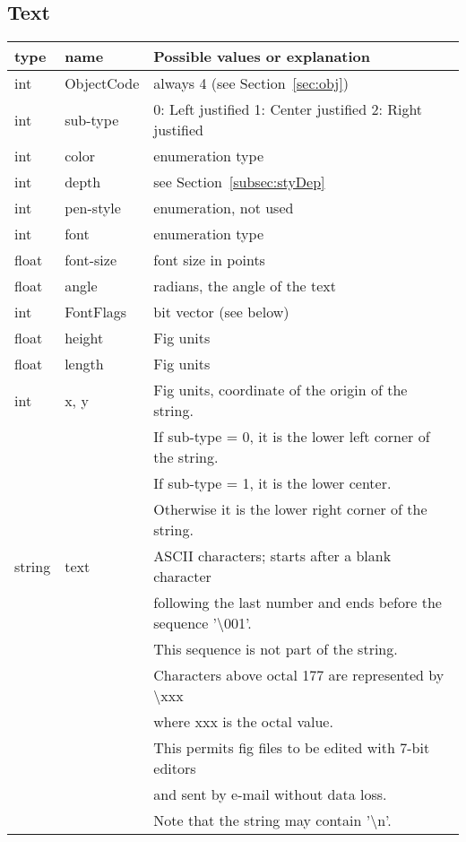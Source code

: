 \documentclass[10pt, a4paper]{article}
\begin{document}
\subsection{Text}\label{subsec:text}

\begin{tabular}{|lll|}
\hline
type & name & Possible values or explanation \\
\hline
\hline
int     & ObjectCode     & always 4 (see Section~\ref{sec:obj}) \\
int     & sub-type   & 0: Left justified
                       1: Center justified
                       2: Right justified \\
int     & color      & enumeration type \\
int     & depth      & see Section~\ref{subsec:styDep} \\
int     & pen-style  & enumeration, not used \\
int     & font       & enumeration type \\
float   & font-size  & font size in points \\
float   & angle      & radians, the angle of the text \\
int     & FontFlags & bit vector (see below) \\
float   & height     & Fig units \\
float   & length     & Fig units \\
int     & x, y       & Fig units, coordinate of the origin of the string.  \\
&&                     If sub-type = 0, 
                       it is the lower left corner of the string.\\
&&                     If sub-type = 1, 
                       it is the lower center.  \\
&&                     Otherwise it is the lower right corner of the string. \\
string    & text     & ASCII characters; 
                       starts after a blank character \\
&&                     following the last number and
                       ends before the sequence '\textbackslash 001'.  \\
&&                     This sequence is not part of the string.\\
&&                     Characters above octal 177 are
                       represented by \textbackslash xxx\\
&&                     where xxx is the octal value.  \\
&&                     This permits fig files to
                       be edited with 7-bit editors \\
&&                     and sent by e-mail without data loss.\\
&&                     Note that the string may contain '\textbackslash n'. \\
\hline
\end{tabular}
\end{document}
